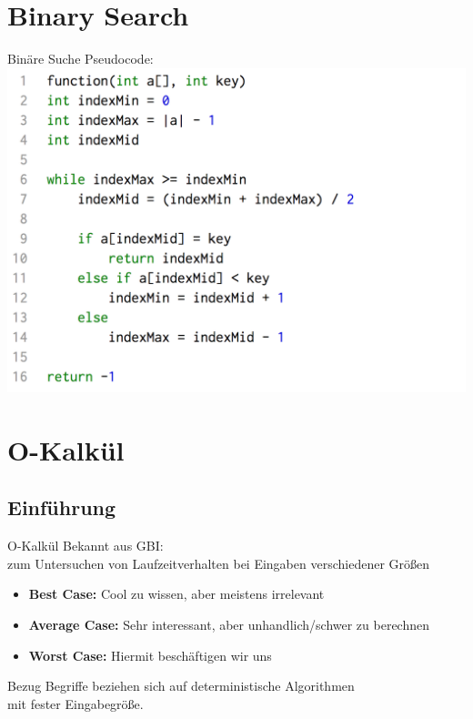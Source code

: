 \documentclass[18pt]{beamer}
\begin{document}
\section{Binary Search}
	\begin{frame}{Binäre Suche}
		Pseudocode: \\
		\includegraphics[align=center, scale=0.2]{pics/pseudocode03.png}			
	\end{frame}

\section{O-Kalkül}
	\subsection{Einführung}
	\begin{frame}{O-Kalkül}
		Bekannt aus GBI: \\
		zum Untersuchen von Laufzeitverhalten bei Eingaben verschiedener Größen
		\begin{itemize}
			\item \textbf{Best Case:} Cool zu wissen, aber meistens irrelevant
			\item \textbf{Average Case:} Sehr interessant, aber unhandlich/schwer zu berechnen
			\item \textbf{Worst Case:} Hiermit beschäftigen wir uns
		\end{itemize}
		\begin{block}{Bezug}
			Begriffe beziehen sich auf deterministische Algorithmen \\mit fester Eingabegröße.
		\end{block}
	\end{frame}
\end{document}
